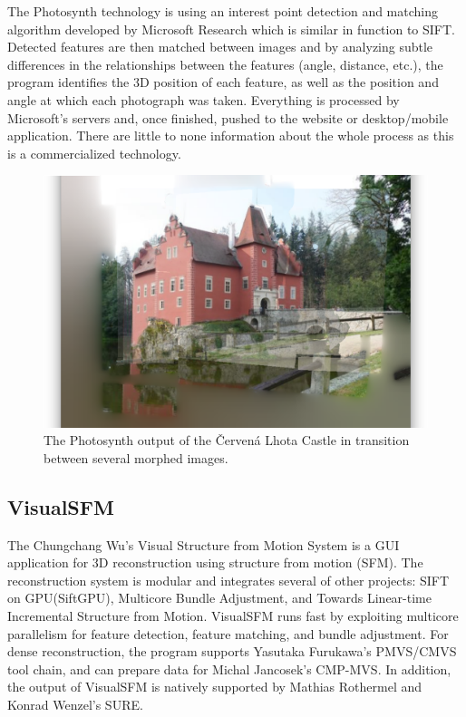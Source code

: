 The Photosynth technology is using an interest point detection and matching algorithm developed by Microsoft Research which is similar in function to SIFT. Detected features are then matched between images and by analyzing subtle differences in the relationships between the features (angle, distance, etc.), the program identifies the 3D position of each feature, as well as the position and angle at which each photograph was taken. Everything is processed by Microsoft's servers and, once finished, pushed to the website or desktop/mobile application. There are little to none information about the whole process as this is a commercialized technology. \cite{www:photosynth}

\begin{figure}[ht]
	\begin{center}
		\includegraphics[keepaspectratio,width=\textwidth]{fig/Photosynth.png}
	\end{center}
	\caption{The Photosynth output of the Červená Lhota Castle in transition between several morphed images.}
	\label{fig:photosynth}
\end{figure}

\subsection*{VisualSFM}
The Chungchang Wu's Visual Structure from Motion System is a GUI application for 3D reconstruction using structure from motion (SFM). The reconstruction system is modular and integrates several of other projects: SIFT on GPU(SiftGPU), Multicore Bundle Adjustment, and Towards Linear-time Incremental Structure from Motion. VisualSFM runs fast by exploiting multicore parallelism for feature detection, feature matching, and bundle adjustment. For dense reconstruction, the program supports Yasutaka Furukawa's PMVS/CMVS tool chain, and can prepare data for Michal Jancosek's CMP-MVS. In addition, the output of VisualSFM is natively supported by Mathias Rothermel and Konrad Wenzel's SURE.

